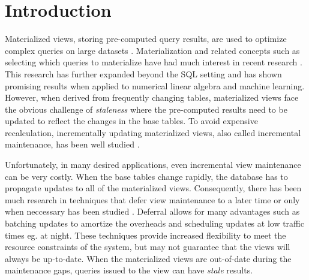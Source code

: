 \section{Introduction}
Materialized views, storing pre-computed query results, are used to optimize complex queries on large datasets \cite{gupta1995maintenance, chirkova2011materialized, halevy2001answering}. 
Materialization and related concepts such as selecting which queries to materialize
have had much interest in recent research \cite{zaharia2012resilient,lefevre2014opportunistic, bailis2014scalable, perez2014history}.
This research has further expanded beyond the SQL setting \cite{nikolic2014linview} and 
has shown promising results when applied to numerical linear algebra and machine learning.
However, when derived from frequently changing tables,
materialized views face the obvious challenge of \emph{staleness} where the pre-computed results need to be updated to reflect the changes in the base tables.
To avoid expensive recalculation, incrementally updating materialized views,
also called incremental maintenance, has been well studied \cite{gupta1995maintenance, chirkova2011materialized}.

Unfortunately, in many desired applications, even incremental view maintenance can be very costly. 
When the base tables change rapidly, the database has to propagate updates to all of the materialized views.
Consequently, there has been much research in techniques that defer view maintenance to a later time or only when neccessary has been studied \cite{chirkova2011materialized, zhou2007lazy}.
Deferral allows for many advantages such as batching updates to amortize the overheads and scheduling updates at low traffic times eg. at night.
These techniques provide increased flexibility to meet the resource constraints of the system, but may not guarantee that the views will always be up-to-date.
When the materialized views are out-of-date during the maintenance gaps, queries issued to the view can have \emph{stale} results. 


